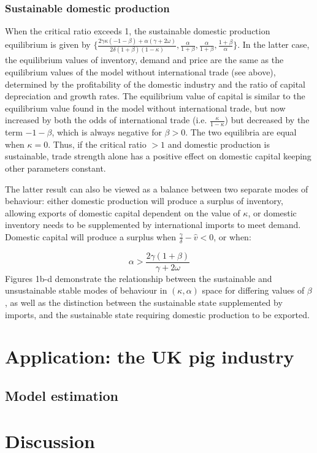 \documentclass[12pt]{article}
\begin{document}
\subsubsection{Sustainable domestic production}

When the critical ratio exceeds 1, the sustainable domestic production equilibrium is given by $\{\frac{2 \gamma \kappa (- 1 - \beta) + \alpha (\gamma + 2 \omega)}{2 \delta (1+\beta)(1 - \kappa) }, \frac{\alpha}{1 + \beta}, \frac{\alpha}{1 + \beta}, \frac{1 + \beta}{\alpha}\}$. In the latter case, the equilibrium values of inventory, demand and price are the same as the equilibrium values of the model without international trade (see above), determined by the profitability of the domestic industry and the ratio of capital depreciation and growth rates. The equilibrium value of capital is similar to the equilibrium value found in the model without international trade, but now increased by both the odds of international trade (i.e. $\frac{\kappa}{1-\kappa}$) but decreased by the term $ - 1 - \beta$, which is always negative for $\beta > 0$.
The two equilibria are equal when $\kappa = 0$. Thus, if the critical ratio $> 1$ and domestic production is sustainable, trade strength alone has a positive effect on domestic capital keeping other parameters constant.

The latter result can also be viewed as a balance between two separate modes of behaviour: either domestic production will produce a surplus of inventory, allowing exports of domestic capital dependent on the value of $\kappa$, or domestic inventory needs to be supplemented by international imports to meet demand. Domestic capital will produce a surplus when $\frac{\gamma}{\delta} - \hat{v} < 0$, or when:

\begin{equation}
  \alpha > \frac{2 \gamma (1 + \beta)}{\gamma + 2 \omega}
\end{equation}
%
Figures 1b-d demonstrate the relationship between the sustainable and unsustainable stable modes of behaviour in $(\kappa, \alpha)$ space for differing values of $\beta$, as well as the distinction between the sustainable state supplemented by imports, and the sustainable state requiring domestic production to be exported.




\section{Application: the UK pig industry}

\subsection{Model estimation}



\section{Discussion}



\newpage
\printbibliography
\end{document}
